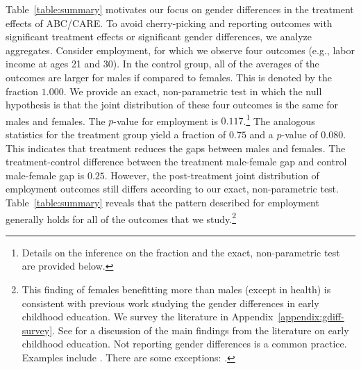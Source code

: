 Table~\ref{table:summary} motivates our focus on gender differences in the treatment effects of ABC/CARE. To avoid cherry-picking and reporting outcomes with significant treatment effects or significant gender differences, we analyze aggregates. Consider employment, for which we observe four outcomes (e.g., labor income at ages 21 and 30). In the control group, all of  the averages of the outcomes are larger for males if compared to females. This is denoted by the fraction $1.000$. We provide an exact, non-parametric test in which the null hypothesis is that the joint distribution of these four outcomes is the same for males and females. The $p$-value for employment is $0.117$.\footnote{Details on the inference on the fraction and the exact, non-parametric test are provided below.} The analogous statistics for the treatment group yield a fraction of $0.75$ and a $p$-value of $0.080$. This indicates that treatment reduces the gaps between males and females. The treatment-control difference between the treatment male-female gap and control male-female gap is $0.25$. However, the post-treatment joint distribution of employment outcomes still differs according to our exact, non-parametric test. Table~\ref{table:summary} reveals that the pattern described for employment generally holds for all of the outcomes that we study.\footnote{This finding of females benefitting more than males (except in health) is consistent with previous work studying the gender differences in early childhood education. We survey the literature in Appendix~\ref{appendix:gdiff-survey}. See \citet{Elango_Hojman_etal_2016_Early-Edu} for a discussion of the main findings from the literature on early childhood education. Not reporting gender differences is a common practice. Examples include \citet{Bernal_Keane_2011_JoLE,Cascio_Schanzenbach_2013_ImpactsExpandingAccess,Bitler_et_al_2014_Head_Start_Unpublished,Kline_Walters_2016_QJE}. There are some exceptions: \citet{Anderson_2008_JASA,Heckman_Moon_etal_2010_QE,Campbell_Conti_etal_2014_EarlyChildhoodInvestments,Garcia_Heckman_Leaf_etal_2017_Comp_CBA_Unpublished}.}

